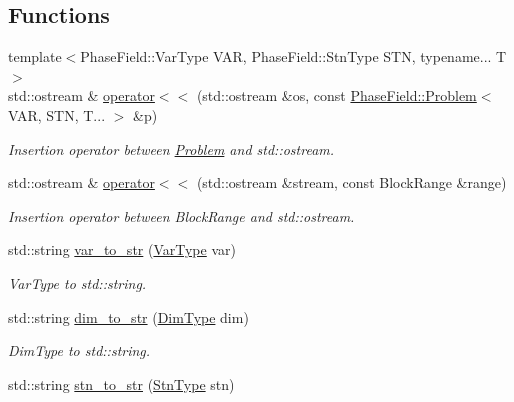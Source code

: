 \subsection*{Functions}
\begin{DoxyCompactItemize}
\item 
{\footnotesize template$<$Phase\+Field\+::\+Var\+Type V\+AR, Phase\+Field\+::\+Stn\+Type S\+TN, typename... T$>$ }\\std\+::ostream \& \hyperlink{namespaceUintah_1_1PhaseField_a2db17c3638c3df36c1050d6a89d0dbd5}{operator$<$$<$} (std\+::ostream \&os, const \hyperlink{classUintah_1_1PhaseField_1_1Problem}{Phase\+Field\+::\+Problem}$<$ V\+AR, S\+TN, T... $>$ \&p)
\begin{DoxyCompactList}\small\item\em Insertion operator between \hyperlink{classUintah_1_1PhaseField_1_1Problem}{Problem} and std\+::ostream. \end{DoxyCompactList}\item 
std\+::ostream \& \hyperlink{namespaceUintah_1_1PhaseField_af380c33ff438112a2ddff1a51432d4ce}{operator$<$$<$} (std\+::ostream \&stream, const Block\+Range \&range)
\begin{DoxyCompactList}\small\item\em Insertion operator between Block\+Range and std\+::ostream. \end{DoxyCompactList}\item 
std\+::string \hyperlink{namespaceUintah_1_1PhaseField_a85973f31ba84b1b5e1b9efa32baef615}{var\+\_\+to\+\_\+str} (\hyperlink{namespaceUintah_1_1PhaseField_a33d355affda78a83f45755ba8388cedd}{Var\+Type} var)
\begin{DoxyCompactList}\small\item\em Var\+Type to std\+::string. \end{DoxyCompactList}\item 
std\+::string \hyperlink{namespaceUintah_1_1PhaseField_a89a79191f10636fd81e9900120c16bf3}{dim\+\_\+to\+\_\+str} (\hyperlink{namespaceUintah_1_1PhaseField_a12bfc68444894dffdf0cb8d9cf0cc76a}{Dim\+Type} dim)
\begin{DoxyCompactList}\small\item\em Dim\+Type to std\+::string. \end{DoxyCompactList}\item 
std\+::string \hyperlink{namespaceUintah_1_1PhaseField_ae83ff43dad3972682130259154aa13ef}{stn\+\_\+to\+\_\+str} (\hyperlink{namespaceUintah_1_1PhaseField_a24d833a720598df1020f5cc2e75f8702}{Stn\+Type} stn)

\end{DoxyCompactItemize}
